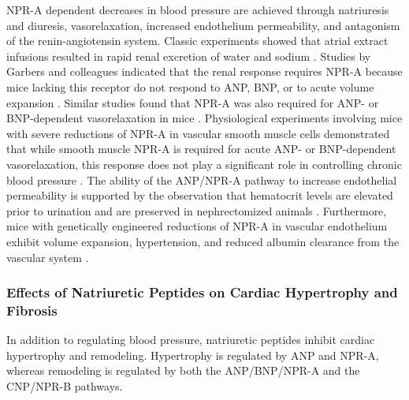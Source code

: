\documentclass[14pt,a4paper,onecolumn]{article}
\begin{document}
NPR-A dependent decreases in blood pressure are achieved through natriuresis and diuresis, vasorelaxation, increased endothelium permeability, and antagonism of the renin-angiotensin system. Classic experiments showed that atrial extract infusions resulted in rapid renal excretion of water and sodium \citep{deBold1981}. Studies by Garbers and colleagues indicated that the renal response requires NPR-A because mice lacking this receptor do not respond to ANP, BNP, or to acute volume expansion \citep{Kishimoto1996}. Similar studies found that NPR-A was also required for ANP- or BNP-dependent vasorelaxation in mice \citep{Lopez1997}. Physiological experiments involving mice with severe reductions of NPR-A in vascular smooth muscle cells demonstrated that while smooth muscle NPR-A is required for acute ANP- or BNP-dependent vasorelaxation, this response does not play a significant role in controlling chronic blood pressure \citep{Holtwick2002}.
The ability of the ANP/NPR-A pathway to increase  endothelial permeability is supported by the observation that hematocrit levels are elevated prior to urination and are preserved in nephrectomized animals \citep{Almeida1986} \citep{Fluckiger1986} \citep{Richards1988}.
 Furthermore, mice with genetically engineered reductions of NPR-A in vascular endothelium exhibit volume expansion, hypertension, and reduced albumin clearance from the vascular system \citep{Sabrane2005}.

\subsubsection{Effects of Natriuretic Peptides on Cardiac Hypertrophy and Fibrosis}
In addition to regulating blood pressure, natriuretic peptides inhibit cardiac hypertrophy and remodeling. Hypertrophy is regulated by ANP and NPR-A, whereas remodeling is regulated by both the ANP/BNP/NPR-A and the CNP/NPR-B pathways.
\end{document}
